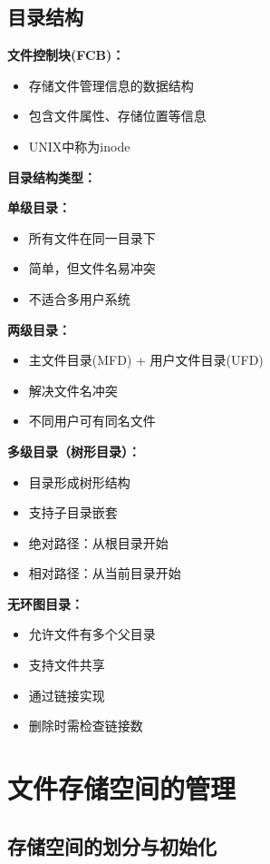 \documentclass[lang=cn,newtx,10pt,scheme=chinese]{../../elegantbook}
\begin{document}
\subsection{目录结构}

\textbf{文件控制块(FCB)：}
\begin{itemize}
  \item 存储文件管理信息的数据结构
  \item 包含文件属性、存储位置等信息
  \item UNIX中称为inode
\end{itemize}

\textbf{目录结构类型：}

\textbf{单级目录：}
\begin{itemize}
  \item 所有文件在同一目录下
  \item 简单，但文件名易冲突
  \item 不适合多用户系统
\end{itemize}

\textbf{两级目录：}
\begin{itemize}
  \item 主文件目录(MFD) + 用户文件目录(UFD)
  \item 解决文件名冲突
  \item 不同用户可有同名文件
\end{itemize}

\textbf{多级目录（树形目录）：}
\begin{itemize}
  \item 目录形成树形结构
  \item 支持子目录嵌套
  \item 绝对路径：从根目录开始
  \item 相对路径：从当前目录开始
\end{itemize}

\textbf{无环图目录：}
\begin{itemize}
  \item 允许文件有多个父目录
  \item 支持文件共享
  \item 通过链接实现
  \item 删除时需检查链接数
\end{itemize}

\section{文件存储空间的管理}

\subsection{存储空间的划分与初始化}
\end{document}
